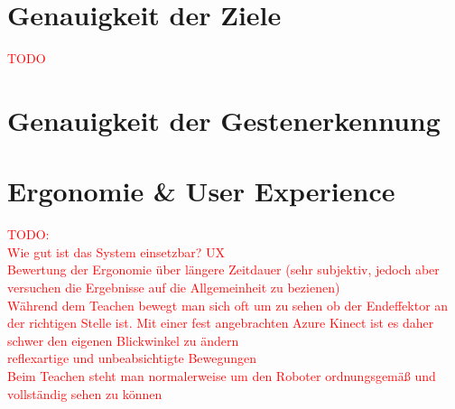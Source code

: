 \section{Genauigkeit der Ziele}
\textcolor{red}{TODO}





\section{Genauigkeit der Gestenerkennung}

\section{Ergonomie \& User Experience}


\textcolor{red}{TODO:\\
Wie gut ist das System einsetzbar? UX\\
Bewertung der Ergonomie über längere Zeitdauer (sehr subjektiv, jedoch aber versuchen die Ergebnisse auf die Allgemeinheit zu bezienen)\\
Während dem Teachen bewegt man sich oft um zu sehen ob der Endeffektor an der richtigen Stelle ist. Mit einer fest angebrachten Azure Kinect ist es daher schwer den eigenen Blickwinkel zu ändern\\
reflexartige und unbeabsichtigte Bewegungen\\
Beim Teachen steht man normalerweise um den Roboter ordnungsgemäß und vollständig sehen zu können
}

